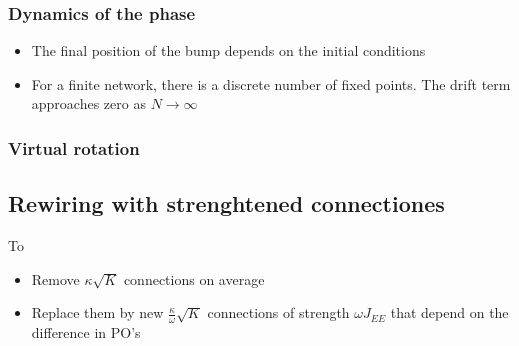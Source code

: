 \subsubsection{Dynamics of the phase}
\begin{itemize}
  \item The final position of the bump depends on the initial conditions
  \item For a finite network, there is a discrete number of fixed points. The drift term approaches zero as $N \rightarrow \infty$
\end{itemize}

\subsubsection{Virtual rotation}

\subsection{Rewiring with strenghtened connectiones}
To 
\begin{itemize}
	\item Remove $\kappa \sqrt{K}$ connections on average
	\item Replace them by new $\frac{\kappa}{\omega} \sqrt{K}$ connections of strength $\omega J_{EE}$ that depend on the difference in PO's
\end{itemize}






